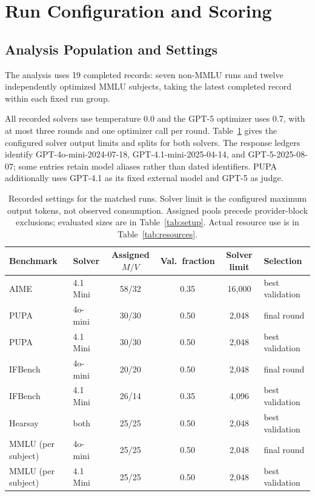 \documentclass[11pt]{article}
\begin{document}
\section{Run Configuration and Scoring}
\label{app:config}
\subsection{Analysis Population and Settings}
\label{app:population}
The analysis uses 19 completed records: seven non-MMLU runs and twelve independently optimized MMLU
subjects, taking the latest completed record within each fixed run group.

All recorded solvers use temperature 0.0 and the GPT-5 optimizer uses 0.7, with at most three rounds and one optimizer
call per round. Table~\ref{tab:config} gives the configured solver output limits and splits for both solvers.
The response ledgers identify GPT-4o-mini-2024-07-18, GPT-4.1-mini-2025-04-14, and GPT-5-2025-08-07; some entries retain
model aliases rather than dated identifiers. PUPA additionally uses GPT-4.1 as its fixed external model and GPT-5 as judge.

\begin{table}[!tp]
\centering
\small
\setlength{\tabcolsep}{5pt}
\begin{tabular}{llcccl}
\toprule
\rowcolor{midblue}Benchmark & Solver & Assigned $M/V$ & Val.\ fraction & Solver limit & Selection \\
\midrule
AIME & 4.1 Mini & 58/32 & 0.35 & 16,000 & best validation \\
PUPA & 4o-mini & 30/30 & 0.50 & 2,048 & final round \\
PUPA & 4.1 Mini & 30/30 & 0.50 & 2,048 & best validation \\
IFBench & 4o-mini & 20/20 & 0.50 & 2,048 & final round \\
IFBench & 4.1 Mini & 26/14 & 0.35 & 4,096 & best validation \\
Hearsay & both & 25/25 & 0.50 & 2,048 & best validation \\
MMLU (per subject) & 4o-mini & 25/25 & 0.50 & 2,048 & final round \\
MMLU (per subject) & 4.1 Mini & 25/25 & 0.50 & 2,048 & best validation \\
\bottomrule
\end{tabular}
\caption{Recorded settings for the matched runs. Solver limit is the configured maximum output tokens, not observed
consumption. Assigned pools precede provider-block exclusions; evaluated sizes are in Table~\ref{tab:setup}. Actual
resource use is in Table~\ref{tab:resources}.}
\label{tab:config}
\end{table}
\end{document}
